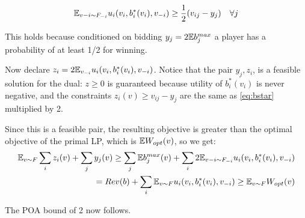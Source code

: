 \begin{align}
\label{eq:bstar}
{\mathbb{E}}_{v{-i}\sim F_{-i}} u_i(v_i,b_i^*(v_i),v_{-i}) \geq \frac 1 2 (v_{ij} - y_j)\quad \forall j
\end{align}

This holds because conditioned on bidding $y_j = 2{\mathbb{E}} b_{j}^{max}$ a player has a probability of at least 1/2 for winning.

Now declare $z_i = 2{\mathbb{E}}_{v_{-i}}u_i(v_i,b_i^*(v_i),v_{-i})$. Notice that the pair $y_j,z_i$, is a feasible solution for the dual: $z\geq 0 $ is guaranteed because utility of $b_i^*(v_i)$ is never negative, and the constraints $z_i(v)\geq v_{ij}-y_j$ are the same as \eqref{eq:bstar} multiplied by 2.

Since this is a feasible pair, the resulting objective is greater than the optimal objective of the primal LP, which is ${\mathbb{E}} W_{opt}(v)$, so we get:
\begin{align*}
{\mathbb{E}}_{v\sim F} \sum_i z_i(v) + \sum_j y_j(v) \geq \sum_j {\mathbb{E}} b_j^{max}(v) + \sum_i 2{\mathbb{E}}_{v{-i}\sim F_{-i}} u_i(v_i,b_i^*(v_i),v_{-i}) \\
= Rev(b) + \sum_i {\mathbb{E}}_{v\sim F} u_i(v_i,b_i^*(v_i),v_{-i}) \geq {\mathbb{E}}_{v\sim F} W_{opt}(v)
\end{align*}

The POA bound of 2 now follows.